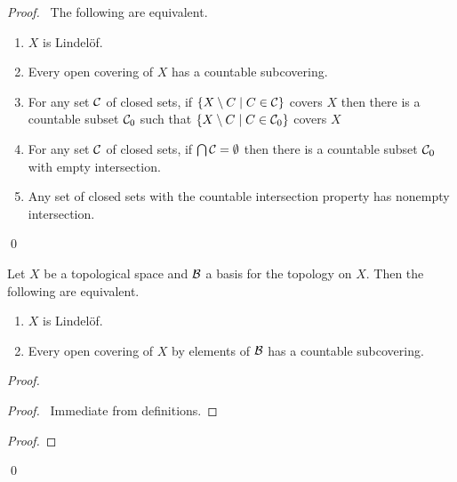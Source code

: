 \begin{proof}
    \pf\ The following are equivalent.
    \begin{enumerate}
        \item $X$ is Lindel\"{o}f.
        \item Every open covering of $X$ has a countable subcovering.
        \item For any set $\mathcal{C}$ of closed sets, if $\{ X \setminus C \mid C \in \mathcal{C} \}$ covers $X$ then there is a countable subset $\mathcal{C}_0$ such that
        $\{ X \setminus C \mid C \in \mathcal{C}_0 \}$ covers $X$
        \item For any set $\mathcal{C}$ of closed sets, if $\bigcap \mathcal{C} = \emptyset$ then there is a countable subset $\mathcal{C}_0$ with empty intersection.
        \item Any set of closed sets with the countable intersection property has nonempty intersection.
    \end{enumerate}
    \qed
\end{proof}

\begin{proposition}[CC]
    \label{proposition:lindelof_basis}
    Let $X$ be a topological space and $\mathcal{B}$ a basis for the topology on $X$.
    Then the following are equivalent.
    \begin{enumerate}
        \item $X$ is Lindel\"{o}f.
        \item Every open covering of $X$ by elements of $\mathcal{B}$ has a countable subcovering.
    \end{enumerate}
\end{proposition}

\begin{proof}
    \pf
    \begin{proof}
        \pf\ Immediate from definitions.
    \end{proof}
    \begin{proof}
    \end{proof}
    \qed
\end{proof}

